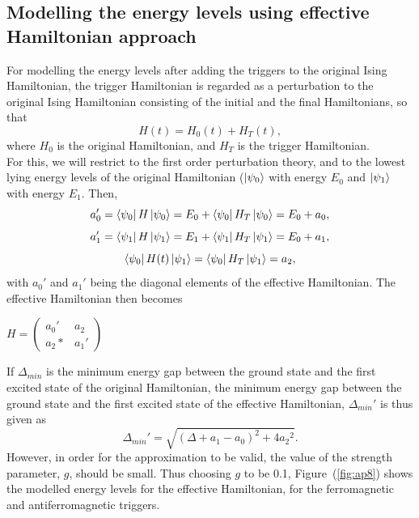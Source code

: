 \documentclass[../main.tex]{subfiles}
\begin{document}
\begin{appendices}
\chapter{Modelling the energy levels using effective Hamiltonian approach}
For modelling the energy levels after adding the triggers to the original Ising Hamiltonian, the trigger Hamiltonian is regarded as a perturbation to the original Ising Hamiltonian consisting of the initial and the final Hamiltonians, so that 
\begin{equation}
H(t)=H_0(t)+H_T(t),
\end{equation}
where $H_0$ is the original Hamiltonian, and $H_T$ is the trigger Hamiltonian.\\
For this, we will restrict to the first order perturbation theory, and to the lowest lying energy levels of the original Hamiltonian ($\ket{\psi_0}$ with energy $E_0$ and $\ket{\psi_1}$ with energy $E_1$. Then,
\begin{equation}
a_0'=\bra{\psi_0}H\ket{\psi_0}=E_0+\bra{\psi_0}H_T \ket{\psi_0}=E_0+a_0,
\end{equation}
\begin{equation}
a_1'=\bra{\psi_1}H\ket{\psi_1}=E_1+\bra{\psi_1}H_T \ket{\psi_1}=E_0+a_1,
\end{equation}
\begin{equation}
\bra{\psi_0}H(t)\ket{\psi_1}=\bra{\psi_0}H_T \ket{\psi_1}=a_2,
\end{equation}
with $a_0'$ and $a_1'$ being the diagonal elements of the effective Hamiltonian. The effective Hamiltonian then becomes
\begin{center}
$ H= \begin{pmatrix}
a_0' & a_2\\
a_2* & a_1'
\end{pmatrix}$
\end{center}
If $\Delta_{min}$ is the minimum energy gap between the ground state and the first excited state of the original Hamiltonian, the minimum energy gap between the ground state and the first excited state of the effective Hamiltonian, $\Delta_{min}'$ is thus given as
\begin{equation}
\Delta_{min}'=\sqrt{{(\Delta+a_1-a_0)}^2+4{a_2}^2}.
\end{equation}
However, in order for the approximation to be valid, the value of the strength parameter, $g$, should be small. Thus choosing $g$ to be 0.1, Figure~(\ref{fig:ap8}) shows the modelled energy levels for the effective Hamiltonian, for the ferromagnetic and antiferromagnetic triggers.

\end{appendices}
\end{document}
